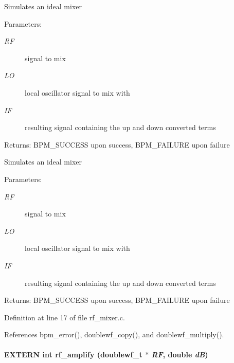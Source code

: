 Simulates an ideal mixer \begin{Desc}
\item[Parameters:]
\begin{description}
\item[{\em RF}]signal to mix \item[{\em LO}]local oscillator signal to mix with \item[{\em IF}]resulting signal containing the up and down converted terms \end{description}
\end{Desc}
\begin{Desc}
\item[Returns:]BPM\_\-SUCCESS upon success, BPM\_\-FAILURE upon failure\end{Desc}
Simulates an ideal mixer \begin{Desc}
\item[Parameters:]
\begin{description}
\item[{\em RF}]signal to mix \item[{\em LO}]local oscillator signal to mix with \item[{\em IF}]resulting signal containing the up and down converted terms \end{description}
\end{Desc}
\begin{Desc}
\item[Returns:]BPM\_\-SUCCESS upon success, BPM\_\-FAILURE upon failure \end{Desc}


Definition at line 17 of file rf\_\-mixer.c.

References bpm\_\-error(), doublewf\_\-copy(), and doublewf\_\-multiply().
\paragraph[rf\_\-amplify]{\setlength{\rightskip}{0pt plus 5cm}EXTERN int rf\_\-amplify ({\bf doublewf\_\-t} $\ast$ {\em RF}, \/  double {\em dB})}\hfill\label{group__rf_gc53a636818174c65e7c55d8a442eca87}



